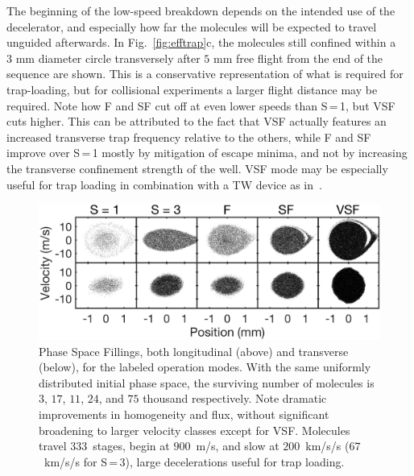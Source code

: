 \documentclass[%
 reprint,
 amsmath,amssymb,
 aps,
prl,
]{revtex4-1}
\begin{document}
The beginning of the low-speed breakdown depends on the intended use of the decelerator, and especially how far the molecules will be expected to travel unguided afterwards.
In Fig.~\ref{fig:efftrap}c, the molecules still confined within a $3\text{ mm}$ diameter circle transversely after $5\text{ mm}$ free flight from the end of the sequence are shown. 
This is a conservative representation of what is required for trap-loading, but for collisional experiments a larger flight distance may be required.
Note how F and SF cut off at even lower speeds than S\,=\,1, but VSF cuts higher. 
This can be attributed to the fact that VSF actually features an increased transverse trap frequency relative to the others, while F and SF improve over S\,=\,1 mostly by mitigation of escape minima, and not by increasing the transverse confinement strength of the well.
VSF mode may be especially useful for trap loading in combination with a TW device as in~\cite{Quintero-Perez2013}.

\begin{figure}[t]
\includegraphics[width=\linewidth]{5x2-PSD-Compare.png}
\vspace{-15pt}
\caption{\label{fig:phasespace}
Phase Space Fillings, both longitudinal (above) and transverse (below), for the labeled operation modes. 
With the same uniformly distributed initial phase space, the surviving number of molecules is $3$, $17$, $11$, $24$, and $75$ thousand respectively.
Note dramatic improvements in homogeneity and flux, without significant broadening to larger velocity classes except for VSF. 
Molecules travel $333$~stages, begin at $900$~m/s, and slow at $200$~km/s/s ($67$~km/s/s for S\,=\,3), large decelerations useful for trap loading.
\vspace{-15pt}}
\end{figure}
\end{document}
